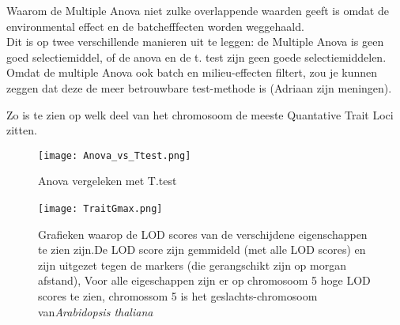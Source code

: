 \documentclass[12pt,a4paper]{article}
\begin{document}
Waarom de Multiple Anova niet zulke overlappende waarden geeft is omdat de environmental effect en de batchefffecten worden weggehaald.\\
Dit is op twee verschillende manieren uit te leggen: de Multiple Anova is geen goed selectiemiddel, of de anova en de t. test zijn geen goede selectiemiddelen.
Omdat de multiple Anova ook batch en milieu-effecten filtert, zou je kunnen zeggen dat deze de meer betrouwbare test-methode is (Adriaan zijn meningen).



Zo is te zien op welk deel van het chromosoom de meeste Quantative Trait Loci zitten.



\pagebreak

\listoffigures
\pagebreak

\begin{figure}
\vspace{-6cm}
\hspace{-1.5cm}
\texttt{[image: Anova\_vs\_Ttest.png]}
\caption{Anova vergeleken met T.test}
\FloatBarrier
\end{figure}


\begin{figure}
\vspace{-1.5cm}
\hspace{-2cm}
\texttt{[image: TraitGmax.png]}
\quad\
\caption[LOD scores per eigenschap]{Grafieken waarop de LOD scores van de verschijdene eigenschappen te zien zijn.De LOD score zijn gemmideld (met alle LOD scores) en zijn uitgezet tegen de markers (die gerangschikt zijn op morgan afstand), Voor alle eigeschappen zijn er op chromosoom 5  hoge LOD scores te zien, chromossom 5  is het geslachts-chromosoom van\textit{Arabidopsis thaliana}}
\end{figure}
\end{document}
